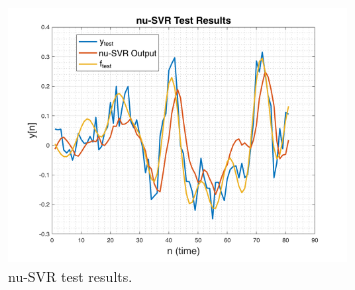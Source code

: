 \documentclass[11pt]{article}
\begin{document}
\begin{figure}[h!]
    \centering
    \includegraphics[width=0.8\textwidth]{figure_5.png}
    \vspace{-1em}\caption{nu-SVR test results.}
\end{figure}
\end{document}
